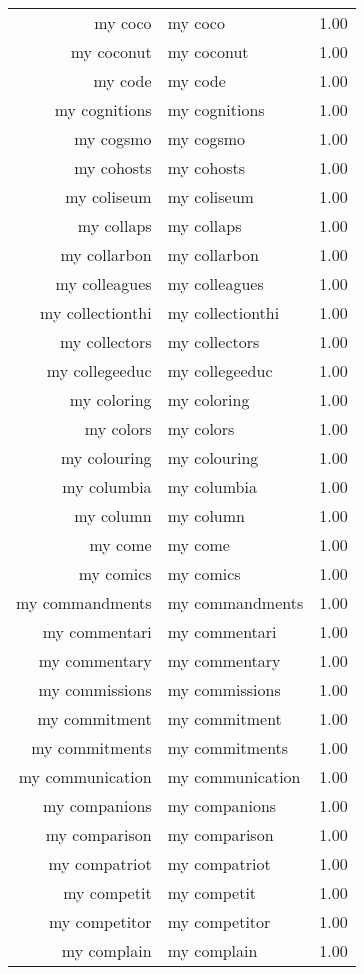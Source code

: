 \begin{table}[ht]
\begin{tabular}{rlr}
  my coco & my coco & 1.00 \\ 
  my coconut & my coconut & 1.00 \\ 
  my code & my code & 1.00 \\ 
  my cognitions & my cognitions & 1.00 \\ 
  my cogsmo & my cogsmo & 1.00 \\ 
  my cohosts & my cohosts & 1.00 \\ 
  my coliseum & my coliseum & 1.00 \\ 
  my collaps & my collaps & 1.00 \\ 
  my collarbon & my collarbon & 1.00 \\ 
  my colleagues & my colleagues & 1.00 \\ 
  my collectionthi & my collectionthi & 1.00 \\ 
  my collectors & my collectors & 1.00 \\ 
  my collegeeduc & my collegeeduc & 1.00 \\ 
  my coloring & my coloring & 1.00 \\ 
  my colors & my colors & 1.00 \\ 
  my colouring & my colouring & 1.00 \\ 
  my columbia & my columbia & 1.00 \\ 
  my column & my column & 1.00 \\ 
  my come & my come & 1.00 \\ 
  my comics & my comics & 1.00 \\ 
  my commandments & my commandments & 1.00 \\ 
  my commentari & my commentari & 1.00 \\ 
  my commentary & my commentary & 1.00 \\ 
  my commissions & my commissions & 1.00 \\ 
  my commitment & my commitment & 1.00 \\ 
  my commitments & my commitments & 1.00 \\ 
  my communication & my communication & 1.00 \\ 
  my companions & my companions & 1.00 \\ 
  my comparison & my comparison & 1.00 \\ 
  my compatriot & my compatriot & 1.00 \\ 
  my competit & my competit & 1.00 \\ 
  my competitor & my competitor & 1.00 \\ 
  my complain & my complain & 1.00 \\ 

\end{tabular}
\end{table}
